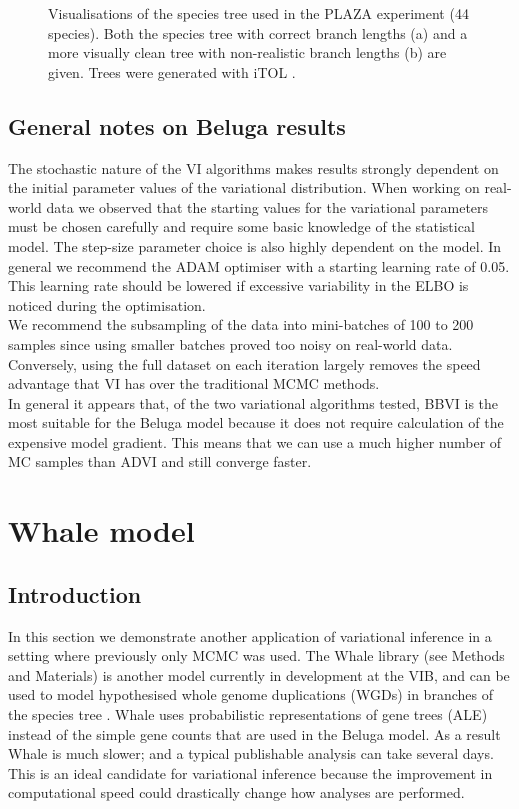 \begin{figure}
\begin{subfigure}{.5\textwidth}
  \caption{}
  \label{fig:sfig2}
\end{subfigure}
\caption[Species tree of 44 PLAZA species]{Visualisations of the species tree used in the PLAZA experiment (44 species). Both the species tree with correct branch lengths (a) and a more visually clean tree with non-realistic branch lengths (b) are given. Trees were generated with iTOL \parencite{itol}.}
\label{fig:PLAZA-trees}
\end{figure}


\subsection{General notes on Beluga results}

The stochastic nature of the VI algorithms makes results strongly dependent on the initial parameter values of the variational distribution. When working on real-world data we observed that the starting values for the variational parameters must be chosen carefully and require some basic knowledge of the statistical model. The step-size parameter choice is also highly dependent on the model. In general we recommend the ADAM optimiser \parencite{ADAM} with a starting learning rate of 0.05. This learning rate should be lowered if excessive variability in the ELBO is noticed during the optimisation.
\\
We recommend the subsampling of the data into mini-batches of 100 to 200 samples since using smaller batches proved too noisy on real-world data. Conversely, using the full dataset on each iteration largely removes the speed advantage that VI has over the traditional MCMC methods.
\\
In general it appears that, of the two variational algorithms tested, BBVI is the most suitable for the Beluga model because it does not require calculation of the expensive model gradient. This means that we can use a much higher number of MC samples than ADVI and still converge faster.

\section{Whale model} \label{sec:whale}

\subsection{Introduction}
In this section we demonstrate another application of variational inference in a setting where previously only MCMC was used. The Whale library (see Methods and Materials) is another model currently in development at the VIB, and can be used to model hypothesised whole genome duplications (WGDs) in branches of the species tree \parencite{whale}. Whale uses probabilistic representations of gene trees (ALE) instead of the simple gene counts that are used in the Beluga model. As a result Whale is much slower; and a typical publishable analysis can take several days. This is an ideal candidate for variational inference because the improvement in computational speed could drastically change how analyses are performed.


